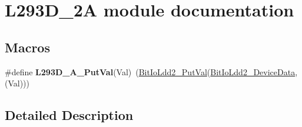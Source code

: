 \hypertarget{group___l293_d__2_a__module}{}\section{L293\+D\+\_\+2A module documentation}
\label{group___l293_d__2_a__module}
\subsection*{Macros}
\begin{DoxyCompactItemize}
\item 
\mbox{\label{group___l293_d__2_a__module_ga3c70dc68a6cc03b99b12a81bcece9c53}} 
\#define {\bfseries L293\+D\+\_\+A\+\_\+\+Put\+Val}(Val)~(\hyperlink{group___bit_io_ldd2__module_gaacea30e307e59fc9acf65e01892ad75b}{Bit\+Io\+Ldd2\+\_\+\+Put\+Val}(\hyperlink{group___bit_io_ldd2__module_gaf2ef02c6b9a8451493963d7ae23c7574}{Bit\+Io\+Ldd2\+\_\+\+Device\+Data}, (Val)))
\end{DoxyCompactItemize}


\subsection{Detailed Description}
